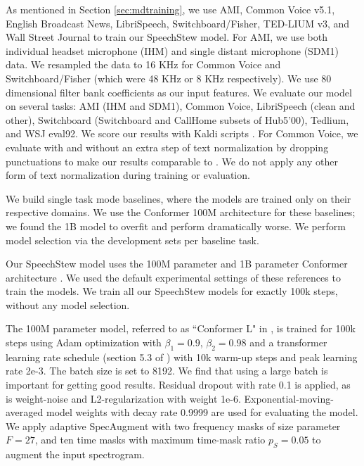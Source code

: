 \documentclass[a4paper]{article}
\begin{document}
As mentioned in Section \ref{sec:mdtraining}, we use AMI, Common Voice v5.1, English Broadcast News, LibriSpeech, Switchboard/Fisher, TED-LIUM v3, and Wall Street Journal to train our SpeechStew model. For AMI, we use both individual headset microphone (IHM) and single distant microphone (SDM1) data. We resampled the data to 16 KHz for Common Voice and Switchboard/Fisher (which were 48 KHz or 8 KHz respectively). We use 80 dimensional filter bank coefficients as our input features. We evaluate our model on several tasks: AMI (IHM and SDM1), Common Voice, LibriSpeech (clean and other), Switchboard (Switchboard and CallHome subsets of Hub5'00), Tedlium, and WSJ eval92. We score our results with Kaldi scripts \cite{povey-asru-2011}. For Common Voice, we evaluate with and without an extra step of text normalization by dropping punctuations to make our results comparable to \cite{likhomanenko-arxiv-2020}. We do not apply any other form of text normalization during training or evaluation.

We build single task mode baselines, where the models are trained only on their respective domains. We use the Conformer 100M architecture \cite{gulati-interspeech-2020} for these baselines; we found the 1B model to overfit and perform dramatically worse. We perform model selection via the development sets per baseline task.

Our SpeechStew model uses the 100M parameter and 1B parameter Conformer architecture \cite{gulati-interspeech-2020,zhang-arxiv-2020}. We used the default experimental settings of these references to train the models. We train all our SpeechStew models for exactly 100k steps, without any model selection.

The 100M parameter model, referred to as ``Conformer L" in \cite{gulati-interspeech-2020}, is trained for 100k steps using Adam optimization with $\beta_1=0.9$, $\beta_2=0.98$ and a transformer learning rate schedule (section 5.3 of \cite{vaswani-nips-2017}) with 10k warm-up steps and peak learning rate 2e-3. The batch size is set to 8192. We find that using a large batch is important for getting good results. Residual dropout with rate 0.1 is applied, as is weight-noise \cite{graves-nips-2011} and L2-regularization with weight 1e-6. Exponential-moving-averaged model weights with decay rate 0.9999 are used for evaluating the model. We apply adaptive SpecAugment \cite{park-interspeech-2019,park-icassp-2020} with two frequency masks of size parameter $F = 27$, and ten time masks with maximum time-mask ratio $p_S = 0.05$ to augment the input spectrogram.
\end{document}
